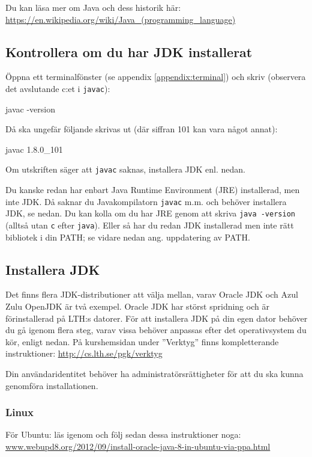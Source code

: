 \noindent Du kan läsa mer om Java och dess historik här: \\
\href{https://en.wikipedia.org/wiki/Java_(programming_language)}{https://en.wikipedia.org/wiki/Java\_(programming\_language)}

\subsection{Kontrollera om du har JDK installerat}\label{appendix:compile:check-jdk}

Öppna ett terminalfönster (se appendix \ref{appendix:terminal}) och skriv (observera det avslutande c:et i \texttt{javac}):
\begin{REPLnonum}
javac -version
\end{REPLnonum}
Då ska ungefär följande skrivas ut (där siffran 101 kan vara något annat):
\begin{REPLnonum}
javac 1.8.0_101
\end{REPLnonum}
Om utskriften säger att \texttt{javac} saknas, installera JDK enl. nedan.

Du kanske redan har enbart Java Runtime Environment (JRE) installerad, men inte JDK. Då saknar du Javakompilatorn \texttt{javac} m.m. och behöver installera JDK, se nedan. Du kan kolla om du har JRE genom att skriva \texttt{java -version} (alltså utan \texttt{c} efter \texttt{java}). Eller så har du redan JDK installerad men inte rätt bibliotek i din PATH; se vidare nedan ang. uppdatering av PATH.



\subsection{Installera JDK}\label{appendix:compile:install-jdk}

Det finns flera JDK-distributioner att välja mellan, varav Oracle JDK och Azul Zulu OpenJDK är två exempel. Oracle JDK har störst spridning och är förinstallerad på LTH:s datorer. För att installera JDK på din egen dator behöver du gå igenom flera steg, varav vissa behöver anpassas efter det operativsystem du kör, enligt nedan. 
På kurshemsidan under ''Verktyg'' finns kompletterande instruktioner:  \url{http://cs.lth.se/pgk/verktyg} 


Din användaridentitet behöver ha administratörsrättigheter för att du ska kunna genomföra installationen.



\subsubsection{Linux} 
För Ubuntu: läs igenom och följ sedan dessa instruktioner noga: \\ \href{http://www.webupd8.org/2012/09/install-oracle-java-8-in-ubuntu-via-ppa.html}{www.webupd8.org/2012/09/install-oracle-java-8-in-ubuntu-via-ppa.html}

